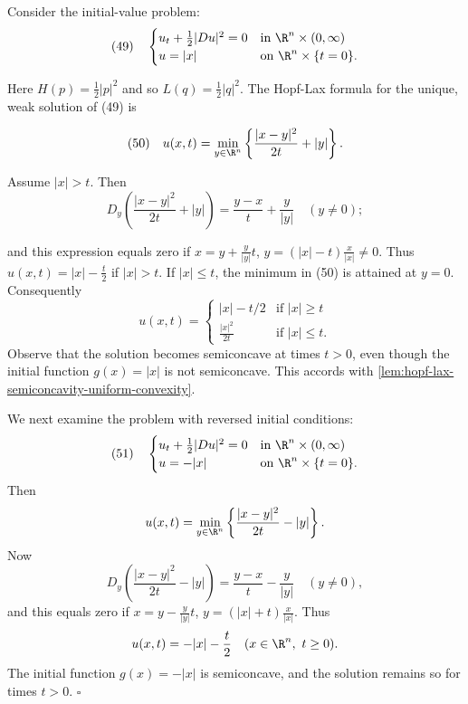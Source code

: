 \begin{example}[Explicit Hopf--Lax solution: $H(p) = \frac{1}{2}|p|^2$, $g = |x|$]
\label{ex:hopf-lax-explicit-example-i}
Consider the initial-value problem:
$$(49) \quad \begin{cases}
u_t + \frac{1}{2}|Du|^2 = 0 & \text{in } \R^n \times (0, \infty) \\
u = |x| & \text{on } \R^n \times \{t = 0\}.
\end{cases}$$

Here $H(p) = \frac{1}{2}|p|^2$ and so $L(q) = \frac{1}{2}|q|^2$. The Hopf-Lax formula for the unique, weak solution of (49) is

$$(50) \quad u(x,t) = \min_{y \in \R^n} \left\{ \frac{|x - y|^2}{2t} + |y| \right\}.$$

Assume $|x| > t$. Then
$$D_y \left( \frac{|x - y|^2}{2t} + |y| \right) = \frac{y - x}{t} + \frac{y}{|y|} \quad (y \neq 0);$$

and this expression equals zero if $x = y + \frac{y}{|y|}t$, $y = (|x| - t)\frac{x}{|x|} \neq 0$. Thus $u(x,t) = |x| - \frac{t}{2}$ if $|x| > t$. If $|x| \leq t$, the minimum in (50) is attained at $y = 0$. Consequently
$$u(x,t) = \begin{cases}
|x| - t/2 & \text{if } |x| \geq t \\
\frac{|x|^2}{2t} & \text{if } |x| \leq t.
\end{cases}$$
Observe that the solution becomes semiconcave at times $t > 0$, even though the initial function $g(x) = |x|$ is not semiconcave. This accords with \cref{lem:hopf-lax-semiconcavity-uniform-convexity}.
\end{example}

\begin{example}[Explicit Hopf--Lax solution: $H(p) = \frac{1}{2}|p|^2$, $g = -|x|$]
\label{ex:hopf-lax-explicit-example-ii}
We next examine the problem with reversed initial conditions:
$$(51) \quad \begin{cases} u_t + \frac{1}{2}|Du|^2 = 0 & \text{in } \R^n \times (0,\infty) \\ u = -|x| & \text{on } \R^n \times \{t=0\}. \end{cases}$$
Then
$$u(x,t) = \min_{y \in \R^n} \left\{ \frac{|x-y|^2}{2t} - |y| \right\}.$$
Now
$$D_y \left( \frac{|x-y|^2}{2t} - |y| \right) = \frac{y-x}{t} - \frac{y}{|y|} \quad (y \neq 0),$$
and this equals zero if $x = y - \frac{y}{|y|}t$, $y = (|x|+t)\frac{x}{|x|}$. Thus
$$u(x,t) = -|x| - \frac{t}{2} \quad (x \in \R^n,\ t \geq 0).$$
The initial function $g(x) = -|x|$ is semiconcave, and the solution remains so for times $t > 0$. $\square$
\end{example}

